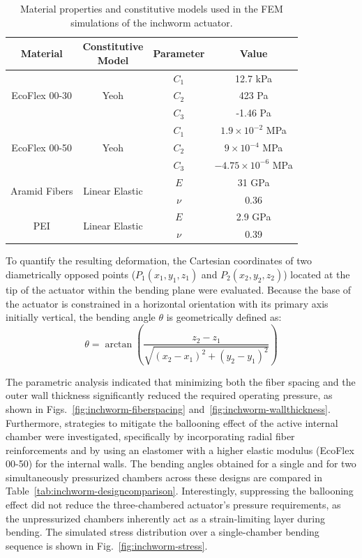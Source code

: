 \begin{table}[tb]
 \caption{Material properties and constitutive models used in the FEM
 simulations of the inchworm actuator.}
 \label{tab:inchworm-materials}
 \centering
 \footnotesize
 \setlength{\tabcolsep}{3pt}
 \begin{tabular}{|c|c|c|c|}
  \hline
  Material & \makecell{Constitutive \\ Model} & Parameter & Value \\ \hline
  \multirow{3}{*}{EcoFlex 00-30} & \multirow{3}{*}{Yeoh} & $C_1$ & 12.7 kPa \\
   &  & $C_2$ & 423 Pa \\
   &  & $C_3$ & -1.46 Pa \\ \hline
   \multirow{3}{*}{EcoFlex 00-50} & \multirow{3}{*}{Yeoh} & $C_1$ & $1.9 \times 10^{-2}$ MPa \\
   &  & $C_2$ & $9 \times 10^{-4}$ MPa \\
   &  & $C_3$ & $-4.75 \times 10^{-6}$ MPa \\ \hline
  \multirow{2}{*}{Aramid Fibers} & \multirow{2}{*}{Linear Elastic} & $E$ & 31 GPa \\
   &  & $\nu$ & 0.36 \\ \hline
  \multirow{2}{*}{PEI} & \multirow{2}{*}{Linear Elastic} & $E$ & 2.9 GPa \\
   &  & $\nu$ & 0.39 \\ \hline
 \end{tabular}
\end{table}

To quantify the resulting deformation, the Cartesian coordinates of two
diametrically opposed points ($P_1(x_1, y_1, z_1)$ and $P_2(x_2, y_2, z_2)$)
located at the tip of the actuator within the bending plane were evaluated.
Because the base of the actuator is constrained in a horizontal orientation
with its primary axis initially vertical, the bending angle $\theta$ is
geometrically defined as:
\begin{equation}
	\theta = \arctan \left( \frac{z_2 - z_1}{\sqrt{(x_2 - x_1)^2 + (y_2 - y_1)^2}} \right)
	\label{eqn:inchworm-bending}
\end{equation}

The parametric analysis indicated that minimizing both the fiber spacing and
the outer wall thickness significantly reduced the required operating
pressure, as shown in Figs.~\ref{fig:inchworm-fiberspacing}
and~\ref{fig:inchworm-wallthickness}. Furthermore, strategies to mitigate the
ballooning effect of the active internal chamber were investigated,
specifically by incorporating radial fiber reinforcements and by using an
elastomer with a higher elastic modulus (EcoFlex 00-50) for the internal
walls. The bending angles obtained for a single and for two simultaneously
pressurized chambers across these designs are compared in
Table~\ref{tab:inchworm-designcomparison}. Interestingly, suppressing the
ballooning effect did not reduce the three-chambered actuator's pressure
requirements, as the unpressurized chambers inherently act as a
strain-limiting layer during bending. The simulated stress distribution over
a single-chamber bending sequence is shown in Fig.~\ref{fig:inchworm-stress}.

